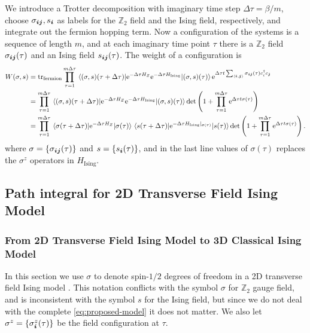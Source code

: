 \documentclass[hyperref, a4paper]{article}
\newcommand*{\ee}{\mathrm{e}}
\newcommand*{\pair}[1]{\langle #1 \rangle}
\newcommand*{\Ztwo}{$\mathbb{Z}_2$ }
\newcommand*{\tfim}{transverse field Ising model }
\newcommand*{\TFIM}{Transverse Field Ising Model }
\newcommand*{\CIM}{Classical Ising Model }
\begin{document}
We introduce a Trotter decomposition with imaginary time step $\Delta \tau = \beta / m$, choose $\sigma_{\vb*{i} \vb*{j}}, s_{\vb*{i}}$ as labels for the \Ztwo field and the Ising field, respectively, and integrate out the fermion hopping term. 
Now a configuration of the systems is a sequence of length $m$, and at each imaginary time point $\tau$ there is a \Ztwo field $\sigma_{\vb*{i} \vb*{j}}(\tau)$ and an Ising field $s_{\vb*{i} \vb*{j}}(\tau)$.
The weight of a configuration is 
\[
    \begin{aligned}
        W(\sigma, s) &= \trace_\text{fermion} \prod_{\tau = 1}^{m\Delta \tau} \mel{(\sigma, s)(\tau+\Delta \tau)}{\ee^{-\Delta \tau H_Z} \ee^{- \Delta \tau H_\text{Ising}}}{(\sigma, s)(\tau)} \ee^{\Delta \tau t \sum_{\pair{\vb*{i}, \vb*{j}}} \sigma_{\vb*{i} \vb*{j}}(\tau) c_i^\dagger c_{\vb*{j}}} \\
        &= \prod_{\tau = 1}^{m\Delta \tau} \mel{(\sigma, s)(\tau+\Delta \tau)}{\ee^{-\Delta \tau H_Z} \ee^{- \Delta \tau H_\text{Ising}}}{(\sigma, s)(\tau)} \det \left(1 + \prod_{\tau = 1}^{m\Delta \tau} \ee^{\Delta \tau t \sigma(\tau)}\right) \\
        &= \prod_{\tau = 1}^{m\Delta \tau} \mel{\sigma(\tau + \Delta \tau)}{\ee^{-\Delta \tau H_Z}}{\sigma(\tau)} \mel{s(\tau + \Delta \tau)}{\ee^{-\Delta \tau H_\text{Ising}|_{\sigma(\tau)}}}{s(\tau)} \det \left(1 + \prod_{\tau = 1}^{m\Delta \tau} \ee^{\Delta \tau t \sigma(\tau)}\right).
    \end{aligned}
\]
where $\sigma = \{\sigma_{\vb*{i} \vb*{j}}(\tau)\}$ and $s = \{s_{\vb*{i}}(\tau)\}$, 
and in the last line values of $\sigma(\tau)$ replaces the $\sigma^z$ operators in $H_\text{Ising}$.

\subsection{Path integral for 2D \TFIM}

\subsubsection{From 2D \TFIM to 3D \CIM}

In this section we use $\sigma$ to denote spin-$1/2$ degrees of freedom in a 2D \tfim.
This notation conflicts with the symbol $\sigma$ for \Ztwo gauge field, 
and is inconsistent with the symbol $s$ for the Ising field, 
but since we do not deal with the complete \eqref{eq:proposed-model} it does not matter.
We also let $\sigma^z = \{\sigma^z_{\vb*{i}}(\tau)\}$ be the field configuration at $\tau$.
\end{document}
